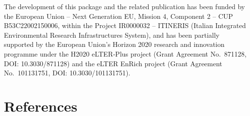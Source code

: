 \documentclass[
]{article}
\begin{document}
The development of this package and the related publication has been
funded by the European Union -- Next Generation EU, Mission 4, Component
2 -- CUP B53C22002150006, within the Project IR0000032 -- ITINERIS
(Italian Integrated Environmental Research Infrastructures System), and
has been partially supported by the European Union's Horizon 2020
research and innovation programme under the H2020 eLTER‑Plus project
(Grant Agreement No.~871128, DOI: 10.3030/871128) and the eLTER EnRich
project (Grant Agreement No.~101131751, DOI: 10.3030/101131751).

\section*{References}\label{references}
\end{document}
